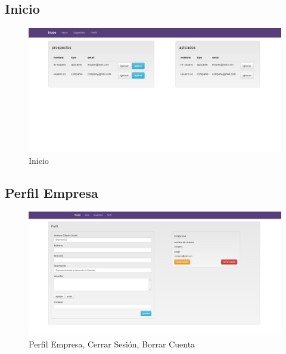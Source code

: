 \newpage 
\subsection{Inicio}
\begin{figure}[h]
\begin{center}
	\includegraphics[scale=0.40]{./resources/vistas/inicioEmpresa.png}
	\caption{Inicio}
	\label{fig:Principal}
\end{center}
\end{figure}



\newpage 
\subsection{Perfil Empresa}
\begin{figure}[h]
\begin{center}
	\includegraphics[scale=0.40]{./resources/vistas/perfilEmpresa.png}
	\caption{Perfil Empresa, Cerrar Sesión, Borrar Cuenta}
	\label{fig:perfilE}
\end{center}
\end{figure}

\newpage 
